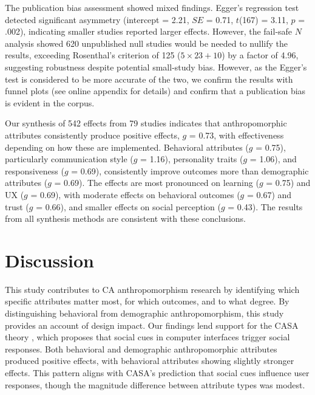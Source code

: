 \documentclass[sigconf,review,anonymous]{acmart}
\begin{document}
The publication bias assessment showed mixed findings. Egger's regression test detected significant asymmetry (intercept = 2.21, $SE$ = 0.71, $t$(167) = 3.11, $p$ = .002), indicating smaller studies reported larger effects. However, the fail-safe $N$ analysis showed 620 unpublished null studies would be needed to nullify the results, exceeding Rosenthal's criterion \cite{rosenthal1979file} of 125 ($5\times23+10$) by a factor of 4.96, suggesting robustness despite potential small-study bias. However, as the Egger's test is considered to be more accurate of the two, we confirm the results with funnel plots (see online appendix for details) and confirm that a publication bias is evident in the corpus.

Our synthesis of 542 effects from 79 studies indicates that anthropomorphic attributes consistently produce positive effects, $g$ = 0.73, with effectiveness depending on how these are implemented. Behavioral attributes ($g$ = 0.75), particularly communication style ($g$ = 1.16), personality traits ($g$ = 1.06), and responsiveness ($g$ = 0.69), consistently improve outcomes more than demographic attributes ($g$ = 0.69). The effects are most pronounced on learning ($g$ = 0.75) and UX ($g$ = 0.69), with moderate effects on behavioral outcomes ($g$ = 0.67) and trust ($g$ = 0.66), and smaller effects on social perception ($g$ = 0.43). The results from all synthesis methods are consistent with these conclusions. %

\section{Discussion}



This study contributes to CA anthropomorphism research by identifying which specific attributes matter most, for which outcomes, and to what degree. By distinguishing behavioral from demographic anthropomorphism, this study provides an account of design impact. Our findings lend support for the CASA theory \citep{nass1997machines}, which proposes that social cues in computer interfaces trigger social responses. Both behavioral and demographic anthropomorphic attributes produced positive effects, with behavioral attributes showing slightly stronger effects. This pattern aligns with CASA's prediction that social cues influence user responses, though the magnitude difference between attribute types was modest.
\end{document}
